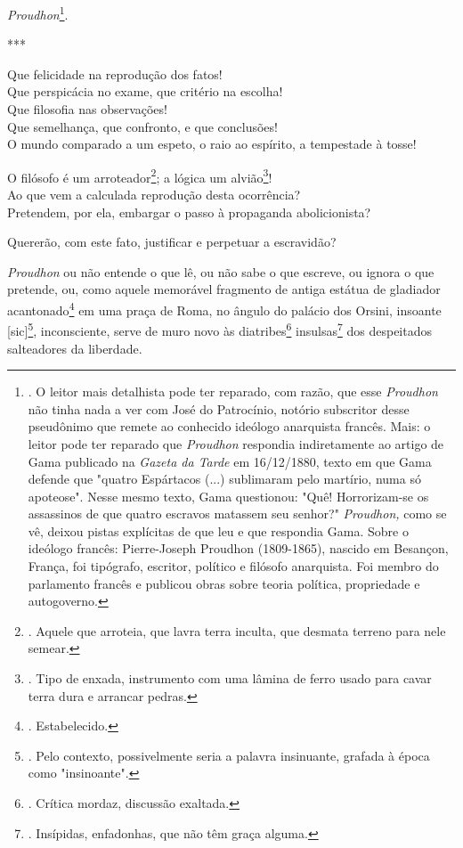 \emph{Proudhon}\footnote{. O leitor mais detalhista pode ter reparado,
  com razão, que esse \emph{Proudhon} não tinha nada a ver com José do
  Patrocínio, notório subscritor desse pseudônimo que remete ao
  conhecido ideólogo anarquista francês. Mais: o leitor pode ter
  reparado que \emph{Proudhon} respondia indiretamente ao artigo de Gama
  publicado na \emph{Gazeta da Tarde} em 16/12/1880, texto em que Gama
  defende que "quatro Espártacos (...) sublimaram pelo martírio, numa só
  apoteose". Nesse mesmo texto, Gama questionou: "Quê! Horrorizam-se os
  assassinos de que quatro escravos matassem seu senhor?"
  \emph{Proudhon,} como se vê, deixou pistas explícitas de que leu e que
  respondia Gama. Sobre o ideólogo francês: Pierre-Joseph Proudhon
  (1809-1865), nascido em Besançon, França, foi tipógrafo, escritor,
  político e filósofo anarquista. Foi membro do parlamento francês e
  publicou obras sobre teoria política, propriedade e autogoverno.}.

***

Que felicidade na reprodução dos fatos!\\
Que perspicácia no exame, que critério na escolha!\\
Que filosofia nas observações!\\
Que semelhança, que confronto, e que conclusões!\\
O mundo comparado a um espeto, o raio ao espírito, a tempestade à tosse!

O filósofo é um arroteador\footnote{. Aquele que arroteia, que lavra
  terra inculta, que desmata terreno para nele semear.}; a lógica um
alvião\footnote{. Tipo de enxada, instrumento com uma lâmina de ferro
  usado para cavar terra dura e arrancar pedras.}!\\
Ao que vem a calculada reprodução desta ocorrência?\\
Pretendem, por ela, embargar o passo à propaganda abolicionista?

Quererão, com este fato, justificar e perpetuar a escravidão?

\emph{Proudhon} ou não entende o que lê, ou não sabe o que escreve, ou
ignora o que pretende, ou, como aquele memorável fragmento de antiga
estátua de gladiador acantonado\footnote{. Estabelecido.} em uma praça
de Roma, no ângulo do palácio dos Orsini, insoante {[}sic{]}\footnote{.
  Pelo contexto, possivelmente seria a palavra insinuante, grafada à
  época como "insinoante".}, inconsciente, serve de muro novo às
diatribes\footnote{. Crítica mordaz, discussão exaltada.}
insulsas\footnote{. Insípidas, enfadonhas, que não têm graça alguma.}
dos despeitados salteadores da liberdade.

